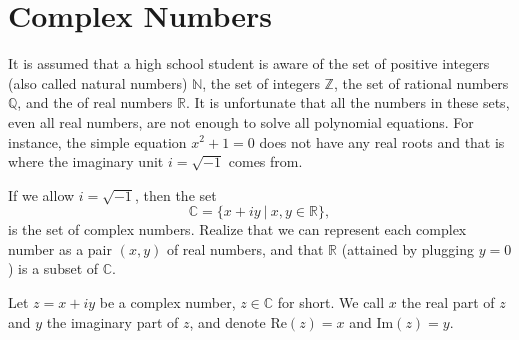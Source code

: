 \section{Complex Numbers}

\begin{tcolorbox}[title={Introduction to Complex Numbers}]
    It is assumed that a high school student is aware of the set of positive integers (also called natural numbers) $\mathbb N$, the set of integers $\mathbb Z$, the set of rational numbers $\mathbb Q$, and the of real numbers $\mathbb R$.  It is unfortunate that all the numbers in these sets, even all real numbers, are not enough to solve all polynomial equations. For instance, the simple equation $x^2+1=0$ does not have any real roots and that is where the imaginary unit $i=\sqrt{-1}$ comes from.
    \begin{definition}
        If we allow $i=\sqrt{-1}$, then the set
        \[\mathbb C = \{x+iy \ | \ x,y \in\mathbb R\},\]
        is the set of complex numbers. Realize that we can represent each complex number as a pair $(x,y)$ of real numbers, and that $\mathbb R$ (attained by plugging $y=0$) is a subset of $\mathbb C$.
    \end{definition}

    \begin{definition}
        Let $z=x+iy$ be a complex number, $z\in\mathbb C$ for short. We call $x$ the real part of $z$ and $y$ the imaginary part of $z$, and denote $\text{Re}(z)=x$ and $\text{Im}(z)=y$.
    \end{definition}


\end{tcolorbox}
